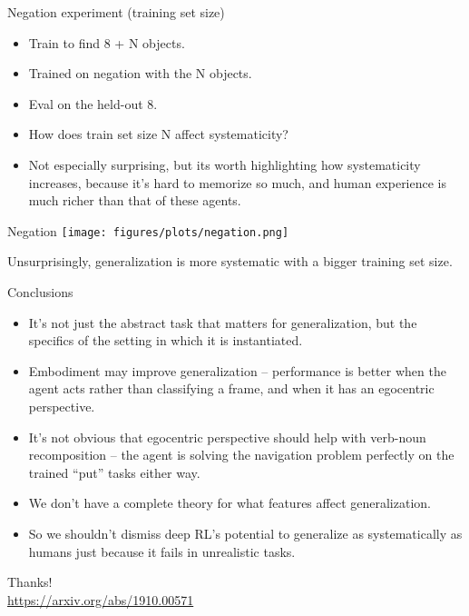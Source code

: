 \documentclass{beamer}
\begin{document}
\begin{frame}{Negation experiment (training set size)}
\begin{itemize}
\item Train to find 8 + N objects.
\item Trained on negation with the N objects.
\item Eval on the held-out 8.
\item How does train set size N affect systematicity?
\item Not especially surprising, but its worth highlighting how systematicity increases, because it's hard to memorize so much, and human experience is much richer than that of these agents.
\end{itemize}
\end{frame}

\begin{frame}{Negation}
\vspace{1em}
\centering
\texttt{[image: figures/plots/negation.png]}
\end{frame}

\begin{frame}[standout]
Unsurprisingly, generalization is more systematic with a bigger training set size.
\end{frame}

\begin{frame}{Conclusions}
\begin{itemize}
\item It's not just the abstract task that matters for generalization, but the specifics of the setting in which it is instantiated. 
\item Embodiment may improve generalization -- performance is better when the agent acts rather than classifying a frame, and when it has an egocentric perspective.
\item It's not obvious that egocentric perspective should help with verb-noun recomposition -- the agent is solving the navigation problem perfectly on the trained ``put'' tasks either way.
\item We don't have a complete theory for what features affect generalization.
\item So we shouldn't dismiss deep RL's potential to generalize as systematically as humans just because it fails in unrealistic tasks. 
\end{itemize}
\end{frame}

\begin{frame}[standout]
Thanks!\\
\url{https://arxiv.org/abs/1910.00571}
\end{frame}
\end{document}
